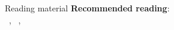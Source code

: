 \documentclass[11pt,aspectratio=169]{beamer}
\begin{document}
\begin{frame}[fragile]{Reading material}
    \textbf{Recommended reading}: \\ \;
        ~\cite[Ch. 3.2.2, 4, 5--5.8]{tamarin-book},
        ~\cite[Ch. 7.3]{meier2013thesis},
        ~\cite{schmidt2012tamarin}
    \printbibliography[heading=none]
\end{frame}
\end{document}
